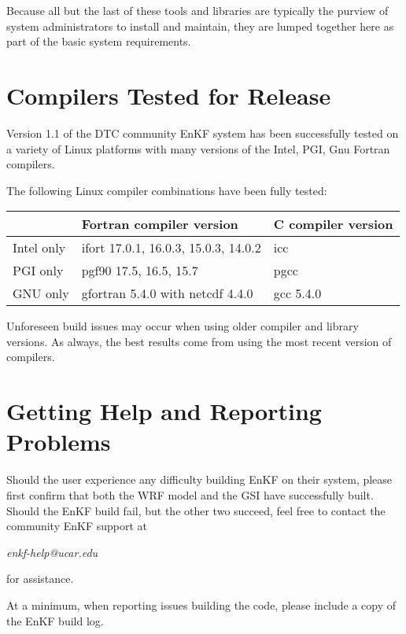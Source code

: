Because all but the last of these tools and libraries are typically the purview of system administrators to install and maintain, they are lumped together here as part of the basic system requirements.

\section{Compilers Tested for Release}  \label{ch2_compilers_tested}

Version 1.1 of the DTC community EnKF system has been successfully tested on a variety of Linux platforms with many versions of the Intel, PGI, Gnu Fortran compilers.

The following Linux compiler combinations have been fully tested:
\begin{table}[htbp]
\centering
\begin{tabular}{| l | l | l |}
\hline
  & Fortran compiler version   &   C compiler version    \\
\hline
\hline
Intel only  &  ifort    17.0.1, 16.0.3, 15.0.3, 14.0.2       & icc \\
\hline
PGI only  &   pgf90   17.5, 16.5, 15.7    &  pgcc  \\
\hline
GNU only &  gfortran  5.4.0  with netcdf 4.4.0  & gcc 5.4.0 \\
\hline
\end{tabular}
\label{ch2_tble1}
\end{table} 

Unforeseen build issues may occur when using older compiler and library versions. As always, the best results come from using the most recent version of compilers.

\section{Getting Help and Reporting Problems} \label{ch2_getting_help}

Should the user experience any difficulty building EnKF on their system, please first confirm that both the WRF model and the GSI have successfully built. Should the EnKF build fail, but the other two succeed, feel free to contact the community EnKF support at 
\begin{center}
\textit{enkf-help@ucar.edu}
\end{center}
 for assistance.

At a minimum, when reporting issues building the code, please include a copy of the EnKF build log.
